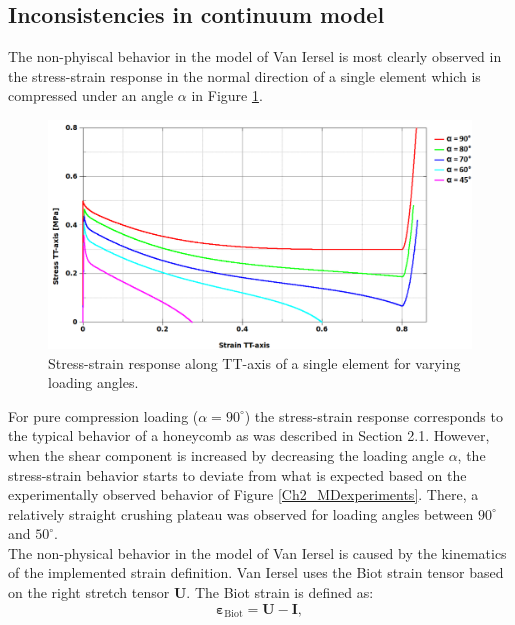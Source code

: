 \subsection{Inconsistencies in continuum model}
The non-phyiscal behavior in the model of Van Iersel is most clearly observed in the stress-strain response in the normal direction of a single element which is compressed under an angle $\alpha$ in Figure \ref{Ch2_dap_shearstress}.
\begin{figure}[H]
    \centering
    \includegraphics[width=0.9\linewidth]{./Images/Ch2/Ch2_dap_shearstress.PNG}
    \caption{Stress-strain response along TT-axis of a single element for varying loading angles.\cite{DAP}}
    \label{Ch2_dap_shearstress}
\end{figure}
For pure compression loading ($\alpha = 90^{\circ}$) the stress-strain response corresponds to the typical behavior of a honeycomb as was described in Section 2.1. However, when the shear component is increased by decreasing the loading angle $\alpha$, the stress-strain behavior starts to deviate from what is expected based on the experimentally observed behavior of Figure \ref{Ch2_MDexperiments}. There, a relatively straight crushing plateau was observed for loading angles between $90^{\circ}$ and $50^{\circ}$.\\
\newline
The non-physical behavior in the model of Van Iersel is caused by the kinematics of the implemented strain definition. Van Iersel uses the Biot strain tensor based on the right stretch tensor $\boldsymbol{U}$. The Biot strain is defined as:
\begin{equation}
    \boldsymbol{\varepsilon}_{\text{Biot}} = \boldsymbol{U} - \boldsymbol{I},
\end{equation}
